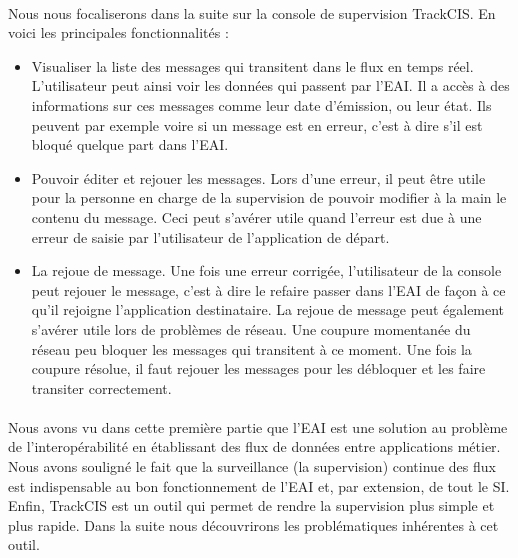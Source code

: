 			\paragraph{}%
			Nous nous focaliserons dans la suite sur la console de supervision TrackCIS.
			En voici les principales fonctionnalités :
			\begin{itemize}
			  \item Visualiser la liste des messages qui transitent dans le flux en temps
			  réel. L'utilisateur peut ainsi voir les données qui passent par l'EAI. Il
			  a accès à des informations sur ces messages comme leur date d'émission, ou
			  leur état. Ils peuvent par exemple voire si un message est en erreur, c'est
			  à dire s'il est bloqué quelque part dans l'EAI.
			  \item Pouvoir éditer et rejouer les messages. Lors d'une erreur, il peut
			  être utile pour la personne en charge de la supervision de pouvoir modifier
			  à la main le contenu du message. Ceci peut s'avérer utile quand l'erreur
			  est due à une erreur de saisie par l'utilisateur de l'application de
			  départ.
			  \item La rejoue de message. Une fois une erreur corrigée, l'utilisateur de
			  la console peut rejouer le message, c'est à dire le refaire passer dans
			  l'EAI de façon à ce qu'il rejoigne l'application destinataire. La rejoue de
			  message peut également s'avérer utile lors de problèmes de réseau. Une
			  coupure momentanée du réseau peu bloquer les messages qui transitent à ce
			  moment. Une fois la coupure résolue, il faut rejouer les messages pour les
			  débloquer et les faire transiter correctement.
			\end{itemize}
		
		\paragraph{}%
		Nous avons vu dans cette première partie que l'EAI est une solution au
		problème de l'interopérabilité en établissant des flux de données entre
		applications métier. Nous avons souligné le fait que la surveillance (la
		supervision) continue des flux est indispensable au bon fonctionnement de
		l'EAI et, par extension, de tout le SI. Enfin, TrackCIS est un outil qui
		permet de rendre la supervision plus simple et plus rapide.\newline
		Dans la suite nous découvrirons les problématiques inhérentes à cet outil.
		
